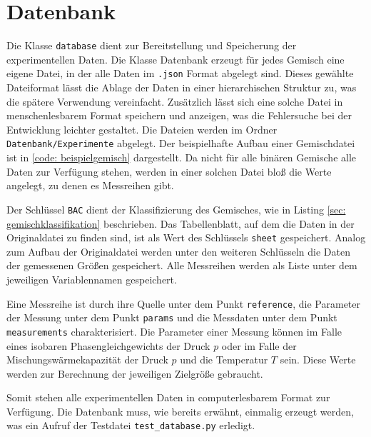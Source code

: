 \documentclass[../thesis.tex]{subfiles}
\begin{document}
\section{Datenbank}

Die Klasse \texttt{database} dient zur Bereitstellung und Speicherung der experimentellen Daten. Die Klasse Datenbank erzeugt für jedes Gemisch eine eigene Datei, in der alle Daten im \texttt{.json} Format abgelegt sind. Dieses gewählte Dateiformat lässt die Ablage der Daten in einer hierarchischen Struktur zu, was die spätere Verwendung vereinfacht. Zusätzlich lässt sich eine solche Datei in menschenlesbarem Format speichern und anzeigen, was die Fehlersuche bei der Entwicklung leichter gestaltet. Die Dateien werden im Ordner \texttt{Datenbank/Experimente} abgelegt. Der beispielhafte Aufbau einer Gemischdatei ist in \autoref{code: beispielgemisch} dargestellt. Da nicht für alle binären Gemische alle Daten zur Verfügung stehen, werden in einer solchen Datei bloß die Werte angelegt, zu denen es Messreihen gibt.


\label{code: beispielgemisch}

Der Schlüssel \texttt{BAC} dient der Klassifizierung des Gemisches, wie in Listing \autoref{sec: gemischklassifikation} beschrieben. Das Tabellenblatt, auf dem die Daten in der Originaldatei zu finden sind, ist als Wert des Schlüssels \texttt{sheet} gespeichert. Analog zum Aufbau der Originaldatei werden unter den weiteren Schlüsseln die Daten der gemessenen Größen gespeichert. Alle Messreihen werden als Liste unter dem jeweiligen Variablennamen gespeichert.

Eine Messreihe ist durch ihre Quelle unter dem Punkt \texttt{reference}, die Parameter der Messung unter dem Punkt \texttt{params} und die Messdaten unter dem Punkt \texttt{measurements} charakterisiert. Die Parameter einer Messung können im Falle eines isobaren Phasengleichgewichts der Druck $ p $ oder im Falle der Mischungswärmekapazität der Druck $ p $ und die Temperatur $ T $ sein. Diese Werte werden zur Berechnung der jeweiligen Zielgröße gebraucht. 

Somit stehen alle experimentellen Daten in computerlesbarem Format zur Verfügung. Die Datenbank muss, wie bereits erwähnt, einmalig erzeugt werden, was ein Aufruf der Testdatei \texttt{test\_database.py} erledigt.
\end{document}
